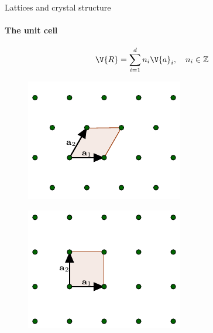 \documentclass{beamer}
\begin{document}
\begin{frame}{Lattices and crystal structure}
	\framesubtitle{The unit cell}
	\begin{equation*}
	\V{R} = \sum_{i = 1}^{d} n_i \V{a}_i, \quad n_i \in \mathbb{Z}
	\end{equation*}
	\begin{figure}[H]
		\centering
		\begin{minipage}{.4\textwidth}
			\centering
			\includegraphics[width=\linewidth]{figures/triangularUnit.pdf}
			\label{fig:triangular_unitcell}
		\end{minipage}%
		\hfill
		\begin{minipage}{.4\textwidth}
			\centering
			\includegraphics[width=\linewidth]{figures/squareUnit.pdf}
			\label{fig:square_unitcell}
		\end{minipage}
	\end{figure}
\end{frame}
\end{document}
